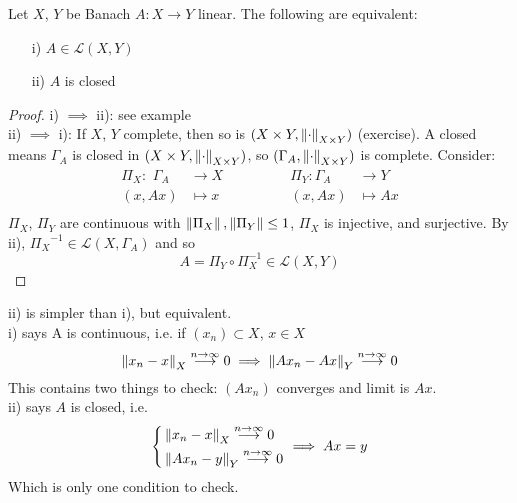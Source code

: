 \documentclass{article}
\begin{document}
\begin{theorem}\nl
\label{closed graph theorem}
Let $X$, $Y$ be Banach $A:X\to Y$ linear. The following are equivalent:
\begin{itemize}
    \item [i)] $A\in\mathcal{L}(X,Y)$
    \item [ii)] $A$ is closed
\end{itemize} 
\end{theorem}
\begin{proof}
    i) $\implies$ ii): see example\\
    ii) $\implies$ i): If $X$, $Y$ complete, then so is $(X\times Y,\left\|{\cdot}\right\|_{X\times Y})$ (exercise). A closed means $\Gamma_A$ is closed in $(X\times Y,\left\|{\cdot}\right\|_{X\times Y})$, so $(\Gamma_A,\left\|{\cdot}\right\|_{X\times Y})$ is complete. Consider:
    \begin{equation}
        \begin{aligned}
            \Pi_X:\,\,\Gamma_A&\to X \qquad\qquad& \Pi_Y:\Gamma_A&\to Y\\
        (x,Ax)&\mapsto x  & (x,Ax)&\mapsto Ax\\
        \end{aligned}    
    \end{equation}
$\Pi_X$, $\Pi_Y$ are continuous with $\left\|{\Pi_X}\right\|,\left\|{\Pi_Y}\right\|\leq 1$, $\Pi_X$ is injective, and surjective. By  ii), ${\Pi_X}^{-1}\in\mathcal{L}{(X,\Gamma_A)}$ and so
$$
A=\Pi_Y\circ \Pi_X^{-1}\in\mathcal{L}(X,Y)
$$
\end{proof}

\begin{remark}
	ii) is simpler than i), but equivalent.\\
	i) says A is continuous, i.e. if $(x_n)\subset X$, $x\in X$
	$$\left\|{x_n-x}\right\|_X\overset{n\to\infty}{\longrightarrow} 0\implies\left\|{Ax_n-Ax}\right\|_Y\overset{n\to\infty}{\longrightarrow}0$$
	This contains two things to check: $(Ax_n)$ converges and limit is $Ax$.\\
	ii) says $A$ is closed, i.e.
	\begin{equation}
		\left\{
		\begin{aligned}
			&\left\|{x_n-x}\right\|_X\overset{n\to\infty}{\longrightarrow}0\\
			&\left\|{Ax_n-y}\right\|_Y\overset{n\to\infty}{\longrightarrow}0\\
		\end{aligned}
		\right.\implies
		Ax=y
	\end{equation}
	Which is only one condition to check.
\end{remark}
\end{document}

